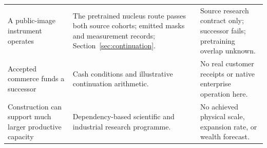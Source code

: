 \begin{longtable}{@{}P{1.53in}P{2.51in}P{2.43in}@{}}
A public-image instrument operates & The pretrained nucleus route passes both source cohorts; emitted masks and measurement records; Section~\ref{sec:continuation}. & Source research contract only; successor fails; pretraining overlap unknown.\\[.35em]
Accepted commerce funds a successor & Cash conditions and illustrative continuation arithmetic. & No real customer receipts or native enterprise operation here.\\[.35em]
Construction can support much larger productive capacity & Dependency-based scientific and industrial research programme. & No achieved physical scale, expansion rate, or wealth forecast.\\
\bottomrule
\end{longtable}
\endgroup
